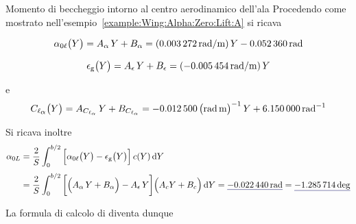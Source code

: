\documentclass[[12pt,twoside]{book}
\begin{document}
\begin{myExampleX}{Momento di beccheggio intorno al centro aerodinamico dell'ala}{}
Procedendo come mostrato nell'esempio~\ref{example:Wing:Alpha:Zero:Lift:A}
si ricava

\[
\alpha_{0\ell} \big( Y \big) = A_{\alpha} \, Y + B_{\alpha}
  = (\SI[round-precision=5]{\myCoeffAAeroTwistWingRADMT}{\radian/\metre}) \, Y
    \SI[round-precision=4]{\myAlphaZeroLiftRootWingRAD}{\radian}
\]

\[
\epsilon_\mathrm{g} \big( Y \big) = A_{\epsilon} \, Y + B_{\epsilon}
  = (\SI[round-precision=5]{\myCoeffATwistWingRADMT}{\radian/\metre}) \, Y
\]

\noindent
e
\[
C_{\ell_\mathlarger{\alpha}} \big( Y \big) = A_{C_{\ell_\alpha}} \, Y + B_{C_{\ell_\alpha}}
  = \SI[round-precision=5]{\myCoeffAClalphaWingRADMT}{\big(\radian\,\metre\big)^{-1}} \, Y
    + \SI[round-precision=3]{\myCoeffBClalphaWingRAD}{\radian^{-1}}
\]

Si ricava inoltre
\[
\begin{split}
\alpha_{0L} 
  & {}= \frac{2}{S} \int_0^{b/2} 
    \Big[ 
      \alpha_{0\ell}\big(Y\big) - \epsilon_\mathrm{g}\big(Y\big) 
    \Big] \, c(Y) \diff{Y}
\\[3pt]
  & {}= \frac{2}{S} \int_0^{b/2} 
    \bigg[ \Big( A_{\alpha} \, Y + B_{\alpha} \Big) - A_{\epsilon} \, Y \bigg] \Big( A_c Y + B_c \Big)
      \diff{Y}
  = \mathunderline{mydarkblue}{ \SI[round-precision=4]{\myAlphaZeroLiftWingRAD}{\radian} }
  = \mathunderline{mydarkblue}{ \SI[round-precision=1]{\myAlphaZeroLiftWingDEG}{\deg} }
\end{split}
\]

La formula di calcolo di  diventa dunque


\end{myExampleX}
\end{document}
